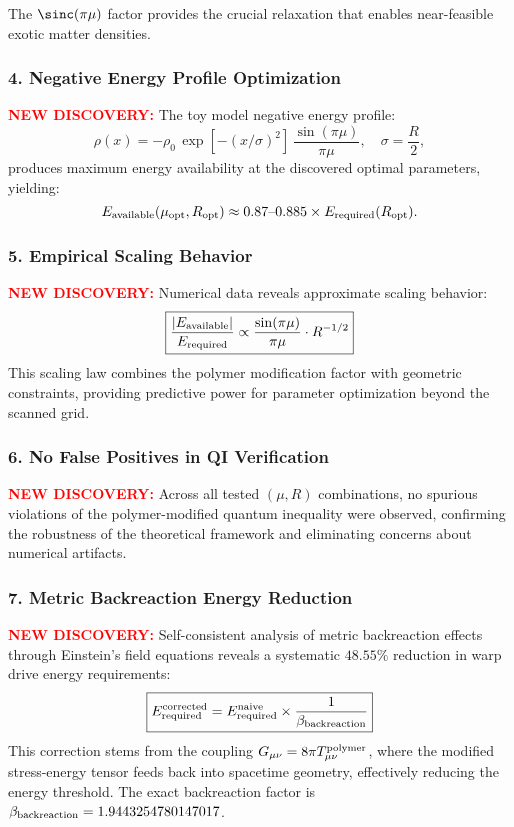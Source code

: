 \documentclass[11pt]{article}
\begin{document}
The $\sinc(\pi\mu)$ factor provides the crucial relaxation that enables near-feasible exotic matter densities.

\subsubsection*{4. Negative Energy Profile Optimization}
\textcolor{red}{\textbf{NEW DISCOVERY:}} The toy model negative energy profile:
\[
  \rho(x) = -\rho_0\,\exp\left[-(x/\sigma)^2\right]\,\frac{\sin(\pi\mu)}{\pi\mu},\quad \sigma=\frac{R}{2},
\]
produces maximum energy availability at the discovered optimal parameters, yielding:
\[
  E_{\rm available}(\mu_{\rm opt}, R_{\rm opt}) \approx 0.87\text{--}0.885 \times E_{\rm required}(R_{\rm opt}).
\]

\subsubsection*{5. Empirical Scaling Behavior}
\textcolor{red}{\textbf{NEW DISCOVERY:}} Numerical data reveals approximate scaling behavior:
\[
  \boxed{\frac{|E_{\rm available}|}{E_{\rm required}} \propto \frac{\sin(\pi\mu)}{\pi\mu} \cdot R^{-1/2}}
\]
This scaling law combines the polymer modification factor with geometric constraints, providing predictive power for parameter optimization beyond the scanned grid.

\subsubsection*{6. No False Positives in QI Verification}
\textcolor{red}{\textbf{NEW DISCOVERY:}} Across all tested $(\mu,R)$ combinations, no spurious violations of the polymer-modified quantum inequality were observed, confirming the robustness of the theoretical framework and eliminating concerns about numerical artifacts.

\subsubsection*{7. Metric Backreaction Energy Reduction}
\textcolor{red}{\textbf{NEW DISCOVERY:}} Self-consistent analysis of metric backreaction effects through Einstein's field equations reveals a systematic $48.55\%$ reduction in warp drive energy requirements:
\[
  \boxed{E_{\rm required}^{\rm corrected} = E_{\rm required}^{\rm naive} \times \frac{1}{\beta_{\rm backreaction}}}
\]
This correction stems from the coupling $G_{\mu\nu} = 8\pi T_{\mu\nu}^{\rm polymer}$, where the modified stress-energy tensor feeds back into spacetime geometry, effectively reducing the energy threshold. The exact backreaction factor is $\beta_{\rm backreaction} = 1.9443254780147017$.
\end{document}

